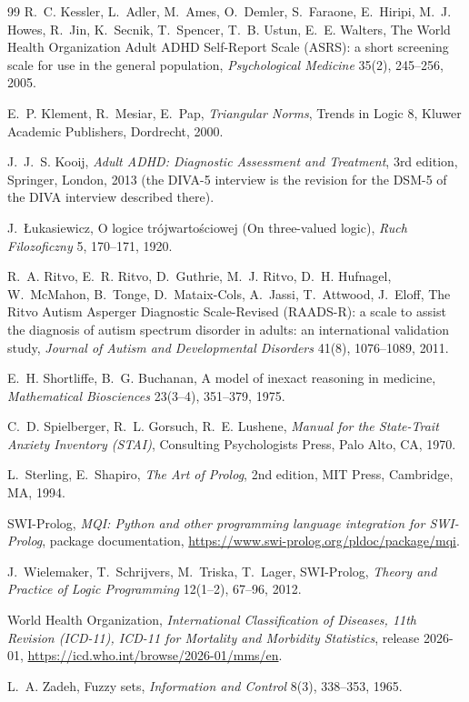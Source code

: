 \begin{thebibliography}{99}
R.~C. Kessler, L.~Adler, M.~Ames, O.~Demler, S.~Faraone, E.~Hiripi, M.~J. Howes,
R.~Jin, K.~Secnik, T.~Spencer, T.~B. Ustun, E.~E. Walters,
The World Health Organization Adult ADHD Self-Report Scale (ASRS): a short
screening scale for use in the general population,
\emph{Psychological Medicine} 35(2), 245--256, 2005.

E.~P. Klement, R.~Mesiar, E.~Pap,
\emph{Triangular Norms}, Trends in Logic 8, Kluwer Academic Publishers,
Dordrecht, 2000.

J.~J.~S. Kooij,
\emph{Adult ADHD: Diagnostic Assessment and Treatment}, 3rd edition,
Springer, London, 2013 (the DIVA-5 interview is the revision for the DSM-5 of
the DIVA interview described there).

J.~{\L}ukasiewicz,
O logice tr\'ojwarto\'sciowej (On three-valued logic),
\emph{Ruch Filozoficzny} 5, 170--171, 1920.

R.~A. Ritvo, E.~R. Ritvo, D.~Guthrie, M.~J. Ritvo, D.~H. Hufnagel, W.~McMahon,
B.~Tonge, D.~Mataix-Cols, A.~Jassi, T.~Attwood, J.~Eloff,
The Ritvo Autism Asperger Diagnostic Scale-Revised (RAADS-R): a scale to assist
the diagnosis of autism spectrum disorder in adults: an international validation
study, \emph{Journal of Autism and Developmental Disorders} 41(8), 1076--1089,
2011.

E.~H. Shortliffe, B.~G. Buchanan,
A model of inexact reasoning in medicine,
\emph{Mathematical Biosciences} 23(3--4), 351--379, 1975.

C.~D. Spielberger, R.~L. Gorsuch, R.~E. Lushene,
\emph{Manual for the State-Trait Anxiety Inventory (STAI)},
Consulting Psychologists Press, Palo Alto, CA, 1970.

L.~Sterling, E.~Shapiro,
\emph{The Art of Prolog}, 2nd edition, MIT Press, Cambridge, MA, 1994.

SWI-Prolog, \emph{MQI: Python and other programming language integration for
SWI-Prolog}, package documentation, \url{https://www.swi-prolog.org/pldoc/package/mqi}.

J.~Wielemaker, T.~Schrijvers, M.~Triska, T.~Lager,
SWI-Prolog, \emph{Theory and Practice of Logic Programming} 12(1--2), 67--96,
2012.

World Health Organization,
\emph{International Classification of Diseases, 11th Revision (ICD-11), ICD-11
for Mortality and Morbidity Statistics}, release 2026-01,
\url{https://icd.who.int/browse/2026-01/mms/en}.

L.~A. Zadeh,
Fuzzy sets, \emph{Information and Control} 8(3), 338--353, 1965.

\end{thebibliography}
